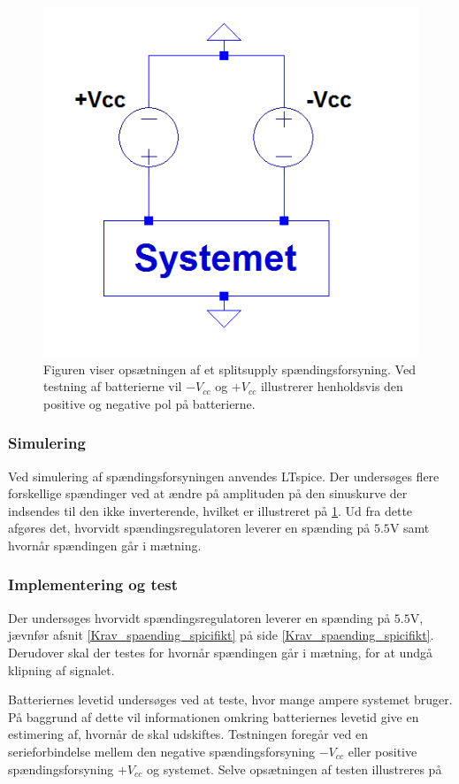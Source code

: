 \begin{figure}[H]
\centering
\includegraphics[scale=0.5]{figures/cProblemloesning/Splitsupply.PNG}
\caption{Figuren viser opsætningen af et splitsupply spændingsforsyning. Ved testning af batterierne vil $-V_{cc}$ og $+V_{cc}$ illustrerer henholdsvis den positive og negative pol på batterierne.}
\label{fig:splitsupply}
\end{figure}
\subsubsection{Simulering}
Ved simulering af spændingsforsyningen anvendes LTspice. Der undersøges flere forskellige spændinger ved at ændre på amplituden på den sinuskurve der indsendes til den ikke inverterende, hvilket er illustreret på \ref{fig:splitsupply}. Ud fra dette afgøres det, hvorvidt spændingsregulatoren leverer en spænding på $5.5$V samt hvornår spændingen går i mætning.



\subsubsection{Implementering og test}
Der undersøges hvorvidt spændingsregulatoren leverer en spænding på $5.5$V, jævnfør afsnit \ref{Krav_spaending_spicifikt} på side \ref{Krav_spaending_spicifikt}. Derudover skal der testes for hvornår spændingen går i mætning, for at undgå klipning af signalet.


Batteriernes levetid undersøges ved at teste, hvor mange ampere systemet bruger. På baggrund af dette vil informationen omkring batteriernes levetid give en estimering af, hvornår de skal udskiftes. Testningen foregår ved en serieforbindelse mellem den negative spændingsforsyning $-V_{cc}$ eller positive spændingsforsyning $+V_{cc}$ og systemet. Selve opsætningen af testen illustreres på %

